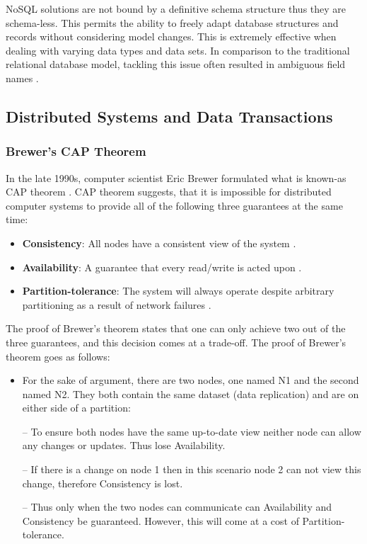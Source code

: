 NoSQL solutions are not bound by a definitive schema structure thus they are schema-less. This permits the ability to freely adapt database structures and records without considering model changes. This is extremely effective when dealing with varying data types and data sets. In comparison to the traditional relational database model, tackling this issue often resulted in ambiguous field names  \cite{nosql1}.

\subsection{Distributed Systems and Data Transactions}\label{distrosystems}
\subsubsection{Brewer's CAP Theorem}\label{cap}
In the late 1990s, computer scientist Eric Brewer formulated what is known-as CAP theorem \cite{toad}. CAP theorem suggests, that it is impossible for distributed computer systems to provide all of the following three guarantees at the same time:
\begin{itemize}
\item \textbf{Consistency}: All nodes have a consistent view of the system \cite{toad}.
\item \textbf{Availability}: A guarantee that every read/write is acted upon \cite{toad}.
\item \textbf{Partition-tolerance}: The system will always operate despite arbitrary partitioning as a result of network failures \cite{toad}.
\end{itemize}
The proof of Brewer's theorem states that one can only achieve two out of the three guarantees, and this decision comes at a trade-off. The proof of Brewer's theorem goes as follows:
\begin{itemize}[leftmargin=*]
\item For the sake of argument, there are two nodes, one named N1 and the second named N2. They both contain the same dataset (data replication) and are on either side of a partition:
\end{itemize}
\begin{itemize}
\item[--] To ensure both nodes have the same up-to-date view neither node can allow any changes or updates. Thus lose Availability.
\item[--] If there is a change on node 1 then in this scenario node 2 can not view this change, therefore Consistency is lost.
\item[--] Thus only when the two nodes can communicate can Availability and Consistency be guaranteed. However, this will come at a cost of Partition-tolerance.
\end{itemize}
